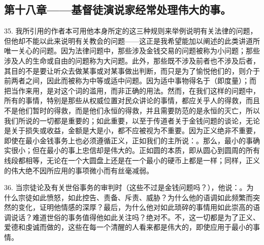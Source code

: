 
\subsection{第十八章——基督徒演说家经常处理伟大的事。}

35. 我所引用的作者本可用他本身所定的这三种规则来举例说明有关法律的问题，但他却不能以此来说明有关教会的问题——这正是我希望能加以阐述的此类讲道所唯一关心的问题。因为法律问题中，那些涉及金钱交易的问题被称为小问题；那些涉及人的生命或自由的问题称为大问题。此外，那些既不涉及前者也不涉及后者，其目的不是要让听众去做某事或对某事做出判断，而只是为了愉悦他们的，则介于前两者之间，因此而被称为中等或适中问题。因为适中事物得名于（即度量）；而把当作来用，是对这个词的滥用，而非正确的用法。然而，在我们这样的问题中，所有的事情，特别是那些从权威位置对民众讲论的事情，都应关乎人的得救，而且不是他们暂时的得救，而是他们永恒的得救，并且需要防范的是永恒的灭亡，所以我们所说的一切都是重要的；如此重要，以至于传道者关于金钱问题的谈论，无论是关于损失或收益，金额是大是小，都不应被视为不重要。因为正义绝非不重要，即使在最小金钱事务上也必须遵循正义，正如我们的主所说：。那么，最小的事确实很小；但在最小的事上忠信却是伟大的。正如圆的本质，即从圆心到圆周的所有线段都相等，无论在一个大圆盘上还是在一个最小的硬币上都是一样；同样，正义的伟大绝不因所应用的事项微小而有丝毫减弱。\par

36. 当宗徒论及有关世俗事务的审判时（这些不过是金钱问题吗？），他说：。为什么宗徒如此愤怒，如此控告、责备、斥责、威胁？为什么他的语调如此频繁而突然的变化，证明他情感的深厚？最后，为什么他对如此琐碎的事情用如此崇高的语调说话？难道世俗的事务值得他如此关注吗？绝对不。不，这一切都是为了正义、爱德和虔诚而做的，这些在每一个清醒的人看来都是伟大的，即使应用于最小的事情。\par

